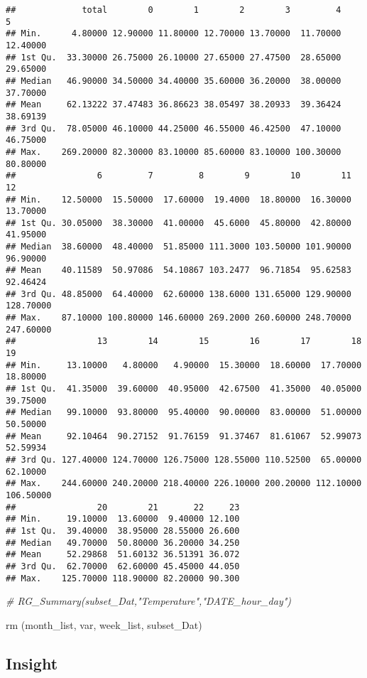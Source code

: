 \documentclass[
]{article}
\newenvironment{Shaded}{\begin{snugshade}}{\end{snugshade}}
\newcommand{\CommentTok}[1]{\textcolor[rgb]{0.56,0.35,0.01}{\textit{#1}}}
\newcommand{\FunctionTok}[1]{\textcolor[rgb]{0.00,0.00,0.00}{#1}}
\newcommand{\NormalTok}[1]{#1}
\begin{document}
\begin{verbatim}
##             total        0        1        2        3         4        5
## Min.      4.80000 12.90000 11.80000 12.70000 13.70000  11.70000 12.40000
## 1st Qu.  33.30000 26.75000 26.10000 27.65000 27.47500  28.65000 29.65000
## Median   46.90000 34.50000 34.40000 35.60000 36.20000  38.00000 37.70000
## Mean     62.13222 37.47483 36.86623 38.05497 38.20933  39.36424 38.69139
## 3rd Qu.  78.05000 46.10000 44.25000 46.55000 46.42500  47.10000 46.75000
## Max.    269.20000 82.30000 83.10000 85.60000 83.10000 100.30000 80.80000
##                6         7         8        9        10        11        12
## Min.    12.50000  15.50000  17.60000  19.4000  18.80000  16.30000  13.70000
## 1st Qu. 30.05000  38.30000  41.00000  45.6000  45.80000  42.80000  41.95000
## Median  38.60000  48.40000  51.85000 111.3000 103.50000 101.90000  96.90000
## Mean    40.11589  50.97086  54.10867 103.2477  96.71854  95.62583  92.46424
## 3rd Qu. 48.85000  64.40000  62.60000 138.6000 131.65000 129.90000 128.70000
## Max.    87.10000 100.80000 146.60000 269.2000 260.60000 248.70000 247.60000
##                13        14        15        16        17        18        19
## Min.     13.10000   4.80000   4.90000  15.30000  18.60000  17.70000  18.80000
## 1st Qu.  41.35000  39.60000  40.95000  42.67500  41.35000  40.05000  39.75000
## Median   99.10000  93.80000  95.40000  90.00000  83.00000  51.00000  50.50000
## Mean     92.10464  90.27152  91.76159  91.37467  81.61067  52.99073  52.59934
## 3rd Qu. 127.40000 124.70000 126.75000 128.55000 110.52500  65.00000  62.10000
## Max.    244.60000 240.20000 218.40000 226.10000 200.20000 112.10000 106.50000
##                20        21       22     23
## Min.     19.10000  13.60000  9.40000 12.100
## 1st Qu.  39.40000  38.95000 28.55000 26.600
## Median   49.70000  50.80000 36.20000 34.250
## Mean     52.29868  51.60132 36.51391 36.072
## 3rd Qu.  62.70000  62.60000 45.45000 44.050
## Max.    125.70000 118.90000 82.20000 90.300
\end{verbatim}

\begin{Shaded}
\begin{Highlighting}[]
  \CommentTok{\# RG\_Summary(subset\_Dat,"Temperature","DATE\_hour\_day")}
  
  \FunctionTok{rm}\NormalTok{ (month\_list, var, week\_list, subset\_Dat)}
\end{Highlighting}
\end{Shaded}

\hypertarget{insight}{%
\subsection{Insight}\label{insight}}
\end{document}

